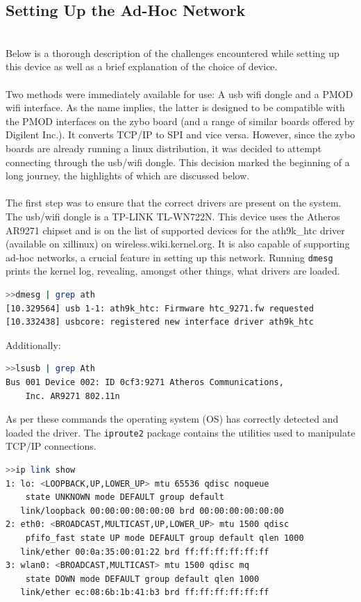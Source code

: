 \subsection{Setting Up the Ad-Hoc Network}~\\
Below is a thorough description of the challenges encountered while setting up this device as well as a brief explanation of the choice of device.
\\~\\
Two methods were immediately available for use: A usb wifi dongle and a PMOD wifi interface.
As the name implies, the latter is designed to be compatible with the PMOD interfaces on the zybo board (and a range of similar boards offered by Digilent Inc.).
It converts TCP/IP to SPI and vice versa.
However, since the zybo boards are already running a linux distribution, it was decided to attempt connecting through the usb/wifi dongle.
This decision marked the beginning of a long journey, the highlights of which are discussed below. 
\\~\\
The first step was to ensure that the correct drivers are present on the system.
The usb/wifi dongle is a TP-LINK TL-WN722N.
This device uses the Atheros AR9271 chipset and is on the list of supported devices for the ath9k\_htc driver (available on xillinux) on wireless.wiki.kernel.org.
It is also capable of supporting ad-hoc networks, a crucial feature in setting up this network.
Running \texttt{dmesg} prints the kernel log, revealing, amongst other things, what drivers are loaded.
\begin{lstlisting}[language=bash]
>>dmesg | grep ath
[10.329564] usb 1-1: ath9k_htc: Firmware htc_9271.fw requested
[10.332438] usbcore: registered new interface driver ath9k_htc
\end{lstlisting}
Additionally:
\begin{lstlisting}[language=bash]
>>lsusb | grep Ath
Bus 001 Device 002: ID 0cf3:9271 Atheros Communications, 
	Inc. AR9271 802.11n
\end{lstlisting}

As per these commands the operating system (OS) has correctly detected and loaded the driver.
The \texttt{iproute2} package contains the utilities used to manipulate TCP/IP connections.
\begin{lstlisting}[language=bash]
>>ip link show
1: lo: <LOOPBACK,UP,LOWER_UP> mtu 65536 qdisc noqueue 
	state UNKNOWN mode DEFAULT group default 
   link/loopback 00:00:00:00:00:00 brd 00:00:00:00:00:00
2: eth0: <BROADCAST,MULTICAST,UP,LOWER_UP> mtu 1500 qdisc 
	pfifo_fast state UP mode DEFAULT group default qlen 1000
   link/ether 00:0a:35:00:01:22 brd ff:ff:ff:ff:ff:ff
3: wlan0: <BROADCAST,MULTICAST> mtu 1500 qdisc mq 
	state DOWN mode DEFAULT group default qlen 1000
   link/ether ec:08:6b:1b:41:b3 brd ff:ff:ff:ff:ff:ff
\end{lstlisting}


